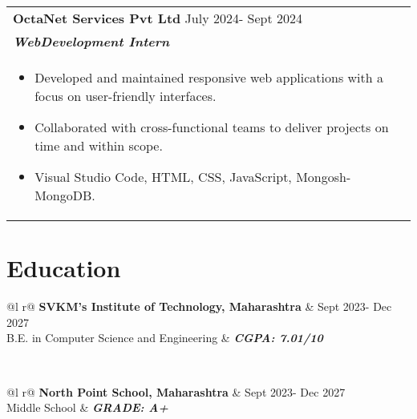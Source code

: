 \documentclass[a4paper,8pt]{article}
\begin{document}
\begin{tabularx}{\linewidth}{ @{}l r@{} }
\textbf{{OctaNet Services Pvt Ltd}} \hfill \color[HTML]{371e77}  July 2024- Sept 2024\\[4pt]
\color[HTML]{371e77}\textbf{\textit{WebDevelopment Intern}}\ \hfill \color[HTML]{4B28A4} \\[5pt]
\begin{minipage}[t]{\linewidth}
    \begin{itemize}[nosep,after=\strut, leftmargin=2em, itemsep=2pt]
        \item Developed and maintained responsive web applications with a focus on user-friendly interfaces.
        \item Collaborated with cross-functional teams to deliver projects on time and within scope.
        \item  Visual Studio Code, HTML, CSS, JavaScript, Mongosh-MongoDB.
    \end{itemize}
\end{minipage}
\end{tabularx}
\vspace{4pt}



\section{Education}
\begin{tabularx}{\linewidth}{ @{}l r@{} }
\color[HTML]{1C033C} \textbf{SVKM’s Institute of Technology, Maharashtra} & \hfill \color[HTML]{371e77} Sept 2023- Dec 2027 \\
\color[HTML]{371e77} B.E. in Computer Science and Engineering & \hfill \color[HTML]{4B28A4} \textit{\textbf{CGPA: 7.01/10}} \\
\end{tabularx}\\[3pt]


\begin{tabularx}{\linewidth}{ @{}l r@{} }
\color[HTML]{1C033C} \textbf{North Point School, Maharashtra} & \hfill \color[HTML]{371e77} Sept 2023- Dec 2027 \\
\color[HTML]{371e77} Middle School & \hfill \color[HTML]{4B28A4} \textit{\textbf{GRADE: A+}} \\
\end{tabularx}\\[3pt]
\end{document}
